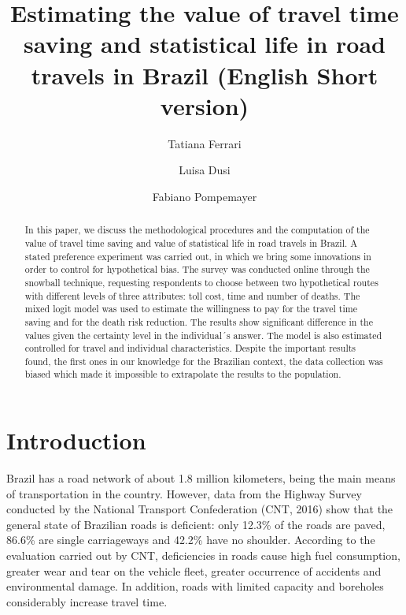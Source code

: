 \documentclass[]{elsarticle} %
\begin{document}
\begin{frontmatter}

  \title{Estimating the value of travel time saving and statistical life in road
travels in Brazil (English Short version)}
    \author[IPEA - Institute of Applied Economic Research (DISET)]{Tatiana Ferrari}
    \author[IPEA - Institute of Applied Economic Research (DISET)]{Luisa Dusi}
  
    \author[IPEA - Institute of Applied Economic Research (DISET)]{Fabiano Pompemayer}
  
      \address[IPEA - Institute of Applied Economic Research (DISET)]{IPEA - Institute of Applied Economic Research. Setor Bancario Sul,
Quadra 1, Edificio BNDES, Brasilia, DF, Brazil}
  
  \begin{abstract}
  In this paper, we discuss the methodological procedures and the
  computation of the value of travel time saving and value of statistical
  life in road travels in Brazil. A stated preference experiment was
  carried out, in which we bring some innovations in order to control for
  hypothetical bias. The survey was conducted online through the snowball
  technique, requesting respondents to choose between two hypothetical
  routes with different levels of three attributes: toll cost, time and
  number of deaths. The mixed logit model was used to estimate the
  willingness to pay for the travel time saving and for the death risk
  reduction. The results show significant difference in the values given
  the certainty level in the individual´s answer. The model is also
  estimated controlled for travel and individual characteristics. Despite
  the important results found, the first ones in our knowledge for the
  Brazilian context, the data collection was biased which made it
  impossible to extrapolate the results to the population.
  \end{abstract}
  
 \end{frontmatter}

\hypertarget{introduction}{%
\section{Introduction}\label{introduction}}

Brazil has a road network of about 1.8 million kilometers, being the
main means of transportation in the country. However, data from the
Highway Survey conducted by the National Transport Confederation (CNT,
2016) show that the general state of Brazilian roads is deficient: only
12.3\% of the roads are paved, 86.6\% are single carriageways and 42.2\%
have no shoulder. According to the evaluation carried out by CNT,
deficiencies in roads cause high fuel consumption, greater wear and tear
on the vehicle fleet, greater occurrence of accidents and environmental
damage. In addition, roads with limited capacity and boreholes
considerably increase travel time.
\end{document}
